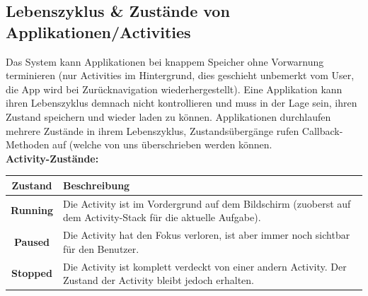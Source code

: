 \documentclass[a4paper]{article}
\begin{document}
\subsection{Lebenszyklus \& Zustände von Applikationen/Activities}
Das System kann Applikationen bei knappem Speicher ohne Vorwarnung terminieren (nur Activities im Hintergrund, dies geschieht unbemerkt vom User, die App wird bei Zurücknavigation wiederhergestellt). Eine Applikation kann ihren Lebenszyklus demnach nicht kontrollieren und muss in der Lage sein, ihren Zustand speichern und wieder laden zu können. Applikationen durchlaufen mehrere Zustände in ihrem Lebenszyklus, Zustandsübergänge rufen Callback-Methoden auf (welche von uns überschrieben werden können.\\

\noindent
\textbf{Activity-Zustände:}
\begin{table} [h!]
	\begin{tabular}{ c | p{10cm} }
		\textbf{Zustand} & \textbf{Beschreibung} \\ \hline
		\textbf{Running} & Die Activity ist im Vordergrund auf dem Bildschirm (zuoberst auf dem Activity-Stack für die aktuelle Aufgabe). \\ \hline
		\textbf{Paused} & Die Activity hat den Fokus verloren, ist aber immer noch sichtbar für den Benutzer. \\ \hline
		\textbf{Stopped} & Die Activity ist komplett verdeckt von einer andern Activity. Der Zustand der Activity bleibt jedoch erhalten.
	\end{tabular}
\end{table}
\newpage
\end{document}
